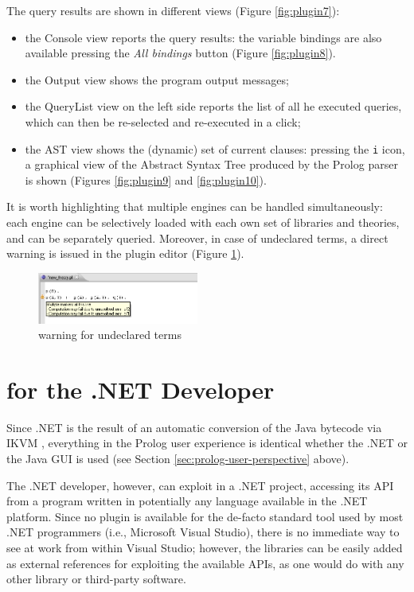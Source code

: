 The query results are shown in different views (Figure \ref{fig:plugin7}):
\begin{itemize}
  \item the \tuprolog{} Console view reports the query results: the variable bindings are also available pressing the \textit{All bindings} button (Figure \ref{fig:plugin8}).
  \item the Output view shows the program output messages;
  \item the QueryList view on the left side reports the list of all he executed queries, which can then be re-selected and re-executed in a click;
  \item the AST view shows the (dynamic) set of current clauses: pressing the \texttt{i} icon, a graphical view of the Abstract Syntax Tree produced by the Prolog parser is shown (Figures \ref{fig:plugin9} and \ref{fig:plugin10}).
\end{itemize}

It is worth highlighting that multiple \tuprolog{}  engines can be handled simultaneously: each engine can be selectively loaded with each own set of libraries and theories, and can be separately queried.
%
Moreover, in case of undeclared terms, a direct warning is issued in the plugin editor  (Figure \ref{fig:plugin11}).

\begin{figure}
\centering
  \includegraphics[width=200px]{images/plugin11.png}
  \caption{warning for undeclared terms}\label{fig:plugin11}
\end{figure}

\section{\tuprolog{} for the .NET Developer}
\label{sec:dotnet-user-perspective}

Since \tuprolog{}.NET is the result of an automatic conversion of the Java bytecode via IKVM \cite{ikvm}, everything in the Prolog user experience is identical whether the .NET or the Java GUI is used (see Section \ref{sec:prolog-user-perspective} above).

The .NET developer, however, can exploit \tuprolog{} in a .NET project, accessing its API from a program written in potentially any language available in the .NET platform.
%
Since no plugin is available for the de-facto standard tool used by most .NET programmers (i.e., Microsoft Visual Studio), there is no immediate way to see \tuprolog{} at work from within Visual Studio; however, the \tuprolog{} libraries can be easily added as external references for exploiting the available APIs, as one would do with any other library or third-party software.

